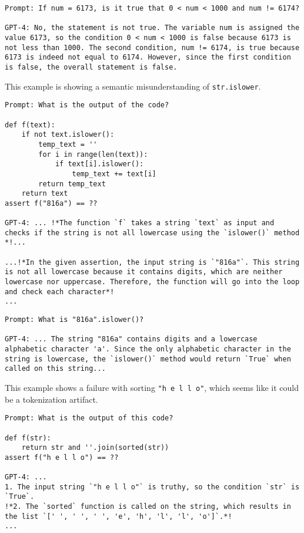 \begin{lstlisting}
Prompt: If num = 6173, is it true that 0 < num < 1000 and num != 6174?

GPT-4: No, the statement is not true. The variable num is assigned the value 6173, so the condition 0 < num < 1000 is false because 6173 is not less than 1000. The second condition, num != 6174, is true because 6173 is indeed not equal to 6174. However, since the first condition is false, the overall statement is false.
\end{lstlisting}

This example is showing a semantic misunderstanding of \texttt{str.islower}.
\begin{lstlisting}
Prompt: What is the output of the code?

def f(text):
    if not text.islower():
        temp_text = ''
        for i in range(len(text)):
            if text[i].islower():
                temp_text += text[i]
        return temp_text
    return text
assert f("816a") == ??

GPT-4: ... !*The function `f` takes a string `text` as input and checks if the string is not all lowercase using the `islower()` method *!...

...!*In the given assertion, the input string is `"816a"`. This string is not all lowercase because it contains digits, which are neither lowercase nor uppercase. Therefore, the function will go into the loop and check each character*!
...
\end{lstlisting}

\begin{lstlisting}
Prompt: What is "816a".islower()?

GPT-4: ... The string "816a" contains digits and a lowercase alphabetic character 'a'. Since the only alphabetic character in the string is lowercase, the `islower()` method would return `True` when called on this string...
\end{lstlisting}

This example shows a failure with sorting \texttt{"h e l l o"}, which seems like it could be a tokenization artifact.

\begin{lstlisting}
Prompt: What is the output of this code?

def f(str):
    return str and ''.join(sorted(str))
assert f("h e l l o") == ??

GPT-4: ...
1. The input string `"h e l l o"` is truthy, so the condition `str` is `True`.
!*2. The `sorted` function is called on the string, which results in the list `[' ', ' ', ' ', 'e', 'h', 'l', 'l', 'o']`.*!
...
\end{lstlisting}

